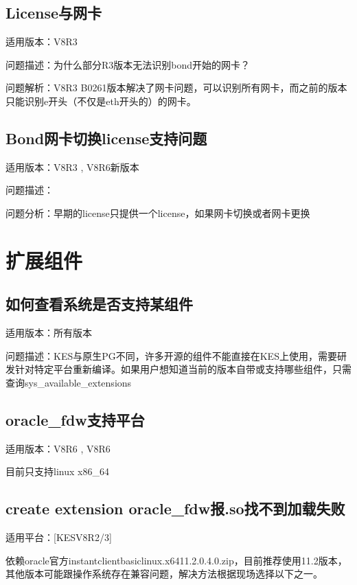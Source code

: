 \documentclass[letterpaper,10pt,english]{sphinxmanual}
\begin{document}
\section{License与网卡}
\label{\detokenize{license:id7}}
适用版本：V8R3

问题描述：为什么部分R3版本无法识别bond开始的网卡？

问题解析：V8R3 B0261版本解决了网卡问题，可以识别所有网卡，而之前的版本只能识别e开头（不仅是eth开头的）的网卡。


\section{Bond网卡切换license支持问题}
\label{\detokenize{license:bondlicense}}
适用版本：V8R3 , V8R6新版本

问题描述：

问题分析：早期的license只提供一个license，如果网卡切换或者网卡更换


\chapter{扩展组件}
\label{\detokenize{extended-plug-in:id1}}\label{\detokenize{extended-plug-in::doc}}

\section{如何查看系统是否支持某组件}
\label{\detokenize{extended-plug-in:id2}}
适用版本：所有版本

问题描述：KES与原生PG不同，许多开源的组件不能直接在KES上使用，需要研发针对特定平台重新编译。如果用户想知道当前的版本自带或支持哪些组件，只需查询sys\_available\_extensions


\section{oracle\_fdw支持平台}
\label{\detokenize{extended-plug-in:oracle-fdw}}
适用版本：V8R6 , V8R6

目前只支持linux x86\_64


\section{create extension oracle\_fdw报.so找不到加载失败}
\label{\detokenize{extended-plug-in:create-extension-oracle-fdw-so}}
适用平台：{[}KESV8R2/3{]}

依赖oracle官方instantclient\sphinxhyphen{}basic\sphinxhyphen{}linux.x64\sphinxhyphen{}11.2.0.4.0.zip，目前推荐使用11.2版本，其他版本可能跟操作系统存在兼容问题，解决方法根据现场选择以下之一。
\end{document}
